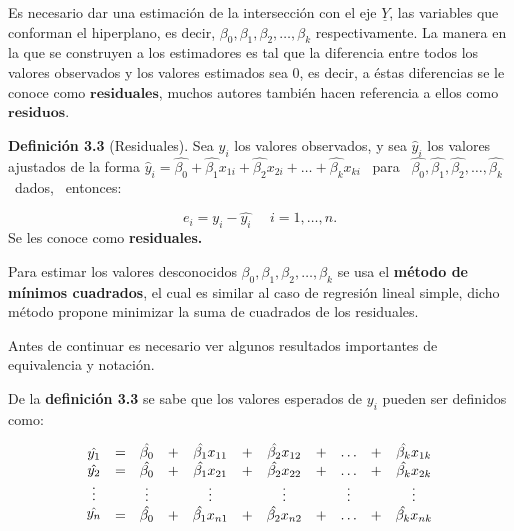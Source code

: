 \documentclass[
  a4paper,
  oneside,
  openany]{book}
\begin{document}
Es necesario dar una estimación de la intersección con el eje \(\underline{Y}\), las variables que conforman el hiperplano, es decir, \(\beta_{0},\beta_{1},\beta_{2},\ldots,\beta_{k}\) respectivamente. La manera en la que se construyen a los estimadores es tal que la diferencia entre todos los valores observados y los valores estimados sea 0, es decir, a éstas diferencias se le conoce como \(\mathbf{residuales}\), muchos autores también hacen referencia a ellos como \(\mathbf{residuos}\).

\textbf{Definición 3.3} (Residuales). Sea \(y_{i}\) los valores observados, y sea \(\hat{y}_{i}\) los valores ajustados de la forma \(\hat{y}_{i}=\hat{\beta_{0}}+\hat{\beta_{1}}x_{1i}+\hat{\beta_{2}}x_{2i}+ \ldots +\hat{\beta_{k}}x_{ki}\) ~para ~\(\hat{\beta_{0}},\hat{\beta_{1}},\hat{\beta_{2}}, \ldots, \hat{\beta_{k}}\) ~dados, ~entonces:

\[e_{i}=y_{i}-\hat{y_{i}} \ \ \ \ \ \ i=1, \ldots,n.\]
Se les conoce como \textbf{residuales.}

Para estimar los valores desconocidos \(\beta_{0},\beta_{1},\beta_{2},\ldots,\beta_{k}\) se usa el \textbf{método de mínimos cuadrados}, el cual es similar al caso de regresión lineal simple, dicho método propone minimizar la suma de cuadrados de los residuales.

Antes de continuar es necesario ver algunos resultados importantes de equivalencia y notación.

De la \textbf{definición 3.3} se sabe que los valores esperados de \(y_{i}\) pueden ser definidos como:

\[
\begin{array}{c}
\hat{y_{1}} \\
\hat{y_{2}} \\
\vdots \\
\hat{y_{n}}\\
\end{array}
\begin{array}{c c c c c c c c c c}
=&\hat{\beta_{0}}&+&\hat{\beta_{1}} x_{11} &+& \hat{\beta_{2}}x_{12}&+& \ldots &+&\hat{\beta_{k}} x_{1k}\\ 
=&\hat{\beta_{0}}&+&\hat{\beta_{1}} x_{21} &+& \hat{\beta_{2}}x_{22}&+& \ldots &+&\hat{\beta_{k}} x_{2k}\\ 
&\vdots && \vdots && \vdots && \vdots && \vdots\\
=&\hat{\beta_{0}}&+&\hat{\beta_{1}} x_{n1} &+& \hat{\beta_{2}}x_{n2}&+& \ldots &+&\hat{\beta_{k}} x_{nk}\\ 
\end{array}
\]
\end{document}
